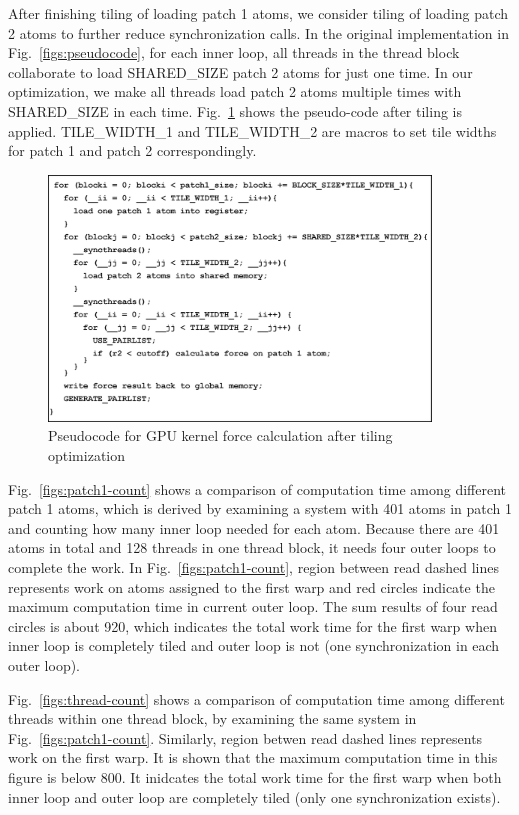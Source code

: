 After finishing tiling of loading patch 1 atoms, we consider tiling of loading patch 2 atoms to further reduce synchronization calls.
In the original implementation in Fig.~\ref{figs:pseudocode}, for each inner loop, all threads in the thread block collaborate to load SHARED\_SIZE
patch 2 atoms for just one time.
In our optimization, we make all threads load patch 2 atoms multiple times with SHARED\_SIZE in each time. Fig.~\ref{figs:pseudocode-tile} shows
the pseudo-code after tiling is applied. TILE\_WIDTH\_1 and TILE\_WIDTH\_2 are macros to set tile widths for patch 1 and patch 2 correspondingly.

\begin{figure}[h]
\centering
\setlength{\abovecaptionskip}{-1pt}
\setlength{\belowcaptionskip}{-2pt}
\includegraphics[width=4.0in]{figs/pseudocode-tile.eps}
\caption{Pseudocode for GPU kernel force calculation after tiling optimization}
\label{figs:pseudocode-tile}
\end{figure}

Fig.~\ref{figs:patch1-count} shows a comparison of computation time among different patch 1 atoms, which is derived by examining a system with 401 atoms in patch 1
and counting how many inner loop needed for each atom. Because there are 401 atoms in total and 128 threads in one thread block, it needs four outer loops to
complete the work. In Fig.~\ref{figs:patch1-count}, region between read dashed lines represents work on atoms assigned to the first
warp and red circles indicate the maximum computation time in current outer loop. The sum results of four read circles is about 920, which indicates
the total work time for the first warp when inner loop is completely tiled and outer loop is not (one synchronization in each outer loop).

Fig.~\ref{figs:thread-count} shows a comparison of computation time among different threads within one thread block, by examining the same system
in Fig.~\ref{figs:patch1-count}. Similarly, region betwen read dashed lines represents work on the first warp. It is shown that the maximum computation time
in this figure is below 800. It inidcates the total work time for the first warp when both inner loop and outer loop are completely tiled (only one synchronization exists). 

